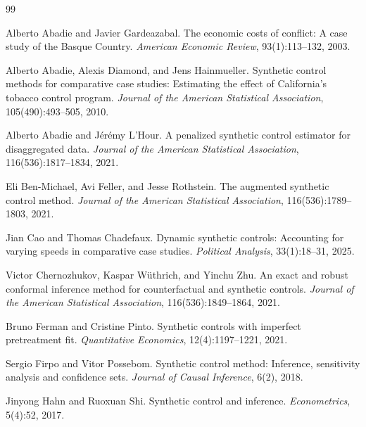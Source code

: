 \documentclass[11pt]{article}
\begin{document}
\newpage

\begin{thebibliography}{99}

Alberto Abadie and Javier Gardeazabal.
\newblock The economic costs of conflict: A case study of the Basque Country.
\newblock \emph{American Economic Review}, 93(1):113--132, 2003.

Alberto Abadie, Alexis Diamond, and Jens Hainmueller.
\newblock Synthetic control methods for comparative case studies: Estimating the effect of California's tobacco control program.
\newblock \emph{Journal of the American Statistical Association}, 105(490):493--505, 2010.

Alberto Abadie and J\'er\'emy L'Hour.
\newblock A penalized synthetic control estimator for disaggregated data.
\newblock \emph{Journal of the American Statistical Association}, 116(536):1817--1834, 2021.

Eli Ben-Michael, Avi Feller, and Jesse Rothstein.
\newblock The augmented synthetic control method.
\newblock \emph{Journal of the American Statistical Association}, 116(536):1789--1803, 2021.

Jian Cao and Thomas Chadefaux.
\newblock Dynamic synthetic controls: Accounting for varying speeds in comparative case studies.
\newblock \emph{Political Analysis}, 33(1):18--31, 2025.

Victor Chernozhukov, Kaspar W\"uthrich, and Yinchu Zhu.
\newblock An exact and robust conformal inference method for counterfactual and synthetic controls.
\newblock \emph{Journal of the American Statistical Association}, 116(536):1849--1864, 2021.

Bruno Ferman and Cristine Pinto.
\newblock Synthetic controls with imperfect pretreatment fit.
\newblock \emph{Quantitative Economics}, 12(4):1197--1221, 2021.

Sergio Firpo and Vitor Possebom.
\newblock Synthetic control method: Inference, sensitivity analysis and confidence sets.
\newblock \emph{Journal of Causal Inference}, 6(2), 2018.

Jinyong Hahn and Ruoxuan Shi.
\newblock Synthetic control and inference.
\newblock \emph{Econometrics}, 5(4):52, 2017.


\end{thebibliography}
\end{document}
